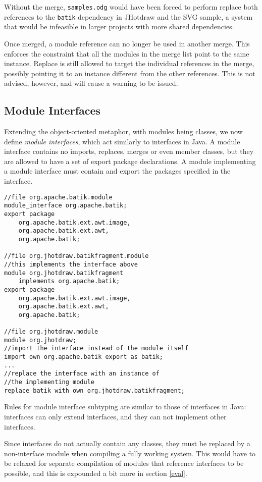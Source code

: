 Without the merge, \texttt{samples.odg} would have been forced to perform 
replace both references to the \texttt{batik} dependency
in JHotdraw and the SVG sample, a system that would be infeasible in larger projects
with more shared dependencies.

Once merged, a module reference can no longer be used in another merge. This
enforces the constraint that all the modules in the merge list point to the
same instance. Replace is still allowed to target the individual 
references in the merge, possibly pointing it to an instance different from
the other references. This is not advised, however, and will cause a warning to be
issued.

\subsection{Module Interfaces}

Extending the object-oriented metaphor, with modules being classes, we 
now define \textit{module interfaces}, which act similarly to interfaces in Java. A module
interface contains no imports, replaces, merges or even member classes, but they
are allowed to have a set of export package declarations. A module implementing
a module interface must contain and export the packages specified in the interface.

\begin{lstlisting}[caption=Module Interfaces]
//file org.apache.batik.module
module_interface org.apache.batik;
export package 
	org.apache.batik.ext.awt.image,
	org.apache.batik.ext.awt,
	org.apache.batik;

//file org.jhotdraw.batikfragment.module
//this implements the interface above
module org.jhotdraw.batikfragment 
	implements org.apache.batik;
export package 
	org.apache.batik.ext.awt.image,
	org.apache.batik.ext.awt,
	org.apache.batik;

//file org.jhotdraw.module
module org.jhotdraw;
//import the interface instead of the module itself
import own org.apache.batik export as batik;
...
//replace the interface with an instance of
//the implementing module
replace batik with own org.jhotdraw.batikfragment; 
\end{lstlisting}

Rules for module interface subtyping are similar to those of interfaces in Java:
interfaces can only extend interfaces, and they can not implement other
interfaces. 

Since interfaces do not actually contain any classes, they must be replaced
by a non-interface module when compiling a fully working system. This would
have to be relaxed for separate compilation of modules that reference interfaces
to be possible, and this is expounded a bit more in section \ref{eval}.

